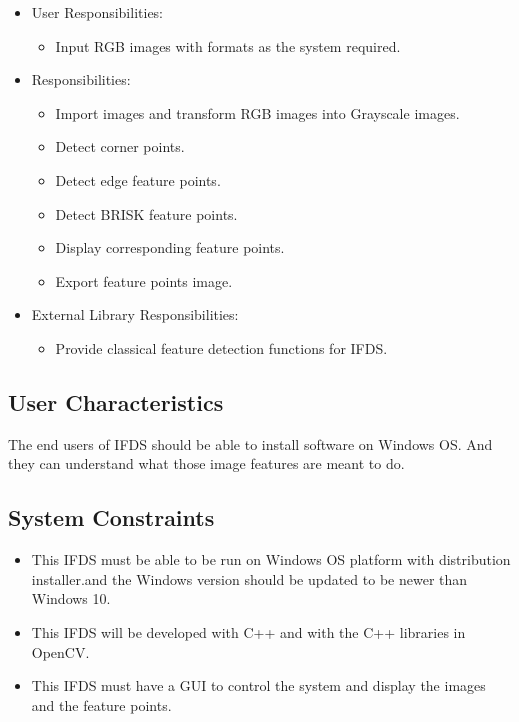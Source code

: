 \documentclass[12pt]{article}
\begin{document}
\begin{itemize}
\item User Responsibilities:
\begin{itemize}
\item  Input RGB images with formats as the system required.
\end{itemize}
\item {} Responsibilities:
\begin{itemize}
\item Import images and transform RGB images into Grayscale images.
\item Detect corner points.
\item Detect edge feature points.
\item Detect BRISK feature points.
\item Display corresponding feature points.
\item Export feature points image.
\end{itemize}
\item External Library Responsibilities:
\begin{itemize}
    \item Provide classical feature detection functions for IFDS.
\end{itemize}
\end{itemize}

\subsection{User Characteristics} \label{SecUserCharacteristics}

 The end users of IFDS should be able to install software on Windows OS. And they can understand what those image features are meant to do.

\subsection{System Constraints}
\begin{itemize}
    \item This IFDS must be able to be run on Windows OS platform with distribution installer.and the Windows version should be updated to be newer than Windows 10.
    \item This IFDS will be developed with C++ and with the C++ libraries in OpenCV.
    \item This IFDS must have a GUI to control the system and display the images and the feature points.
    
\end{itemize}
\end{document}

